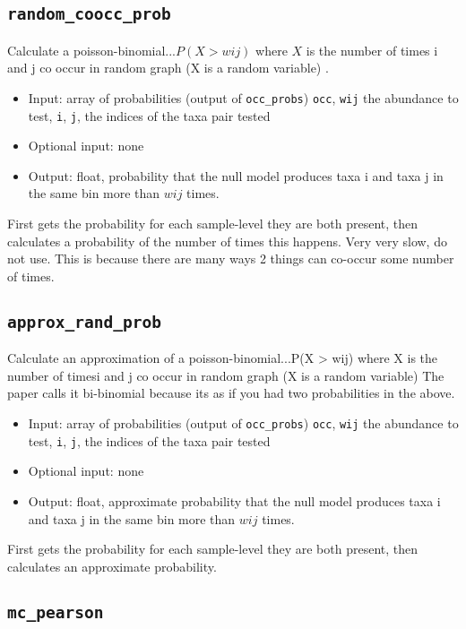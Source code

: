\documentclass[10pt]{article}
\theoremstyle{definition}
\numberwithin{theorem}{section}
\numberwithin{definition}{section}
\numberwithin{lemma}{section}
\numberwithin{corollary}{section}
\numberwithin{clm}{section}
\numberwithin{rmk}{section}
\begin{document}
\cprotect \subsection{\verb|random_coocc_prob|}
Calculate a poisson-binomial...$P(X > wij)$ where $X$ is the number of times i and j co occur in random graph (X is a random variable) \cite{coocc}.
\begin{itemize}
	\item Input: array of probabilities (output of \verb|occ_probs|) \verb|occ|, \verb|wij| the abundance to test, \verb|i|, \verb|j|, the indices of the taxa pair tested
	\item Optional input: none
	\item Output: float, probability that the null model produces taxa i and taxa j in the same bin more than $wij$ times.
\end{itemize}

First gets the probability for each sample-level they are both present, then calculates a probability of the number of times this happens. Very very slow, do not use. This is because there are many ways 2 things can co-occur some number of times.

\cprotect \subsection{\verb|approx_rand_prob|}
Calculate an approximation of a poisson-binomial...P(X > wij) where X 
is the number of timesi and j co occur in random graph (X is a random variable)
The paper \cite{coocc} calls it bi-binomial because its as if you had two 
probabilities in the above.

\begin{itemize}
	\item Input: array of probabilities (output of \verb|occ_probs|) \verb|occ|, \verb|wij| the abundance to test, \verb|i|, \verb|j|, the indices of the taxa pair tested
	\item Optional input: none
	\item Output: float, approximate probability that the null model produces taxa i and taxa j in the same bin more than $wij$ times.
\end{itemize}

First gets the probability for each sample-level they are both present, then calculates an approximate probability.

\cprotect \subsection{\verb|mc_pearson|}
\end{document}
